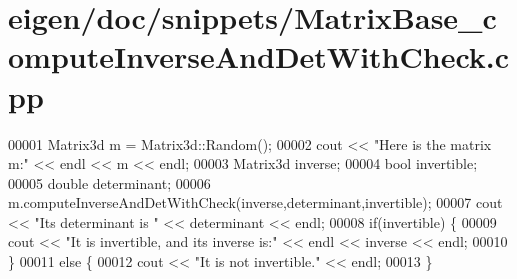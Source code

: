 \hypertarget{eigen_2doc_2snippets_2_matrix_base__compute_inverse_and_det_with_check_8cpp_source}{}\section{eigen/doc/snippets/\+Matrix\+Base\+\_\+compute\+Inverse\+And\+Det\+With\+Check.cpp}
\label{eigen_2doc_2snippets_2_matrix_base__compute_inverse_and_det_with_check_8cpp_source}

\begin{DoxyCode}
00001 Matrix3d m = Matrix3d::Random();
00002 cout << \textcolor{stringliteral}{"Here is the matrix m:"} << endl << m << endl;
00003 Matrix3d inverse;
00004 \textcolor{keywordtype}{bool} invertible;
00005 \textcolor{keywordtype}{double} determinant;
00006 m.computeInverseAndDetWithCheck(inverse,determinant,invertible);
00007 cout << \textcolor{stringliteral}{"Its determinant is "} << determinant << endl;
00008 \textcolor{keywordflow}{if}(invertible) \{
00009   cout << \textcolor{stringliteral}{"It is invertible, and its inverse is:"} << endl << inverse << endl;
00010 \}
00011 \textcolor{keywordflow}{else} \{
00012   cout << \textcolor{stringliteral}{"It is not invertible."} << endl;
00013 \}
\end{DoxyCode}
